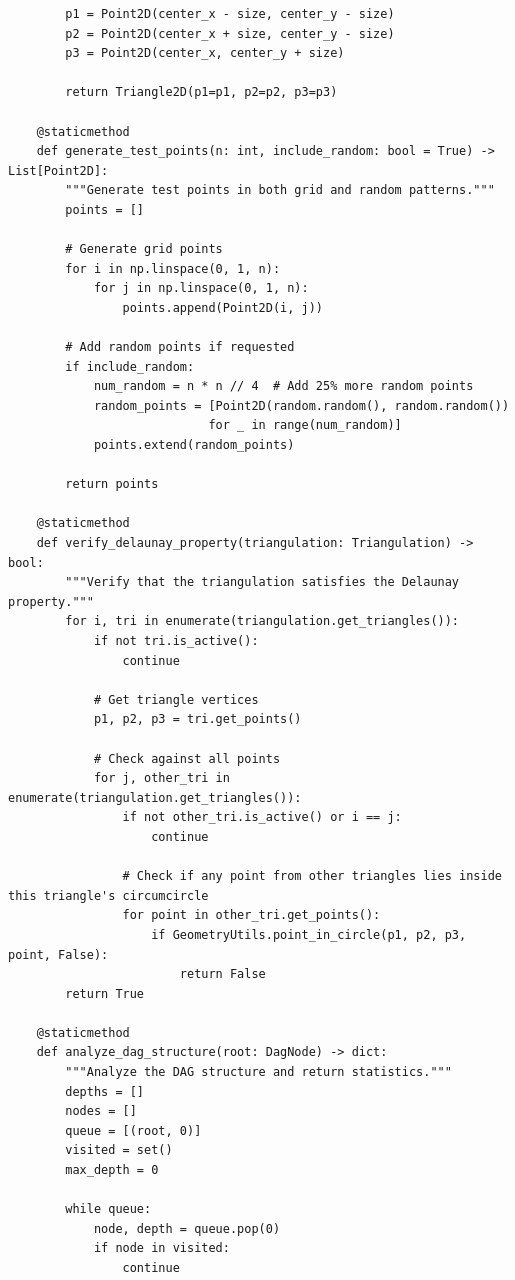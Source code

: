 \documentclass{article}
\begin{document}
\begin{lstlisting}
        p1 = Point2D(center_x - size, center_y - size)
        p2 = Point2D(center_x + size, center_y - size)
        p3 = Point2D(center_x, center_y + size)
        
        return Triangle2D(p1=p1, p2=p2, p3=p3)

    @staticmethod
    def generate_test_points(n: int, include_random: bool = True) -> List[Point2D]:
        """Generate test points in both grid and random patterns."""
        points = []
        
        # Generate grid points
        for i in np.linspace(0, 1, n):
            for j in np.linspace(0, 1, n):
                points.append(Point2D(i, j))
        
        # Add random points if requested
        if include_random:
            num_random = n * n // 4  # Add 25% more random points
            random_points = [Point2D(random.random(), random.random()) 
                            for _ in range(num_random)]
            points.extend(random_points)
        
        return points

    @staticmethod
    def verify_delaunay_property(triangulation: Triangulation) -> bool:
        """Verify that the triangulation satisfies the Delaunay property."""
        for i, tri in enumerate(triangulation.get_triangles()):
            if not tri.is_active():
                continue
                
            # Get triangle vertices
            p1, p2, p3 = tri.get_points()
            
            # Check against all points
            for j, other_tri in enumerate(triangulation.get_triangles()):
                if not other_tri.is_active() or i == j:
                    continue
                    
                # Check if any point from other triangles lies inside this triangle's circumcircle
                for point in other_tri.get_points():
                    if GeometryUtils.point_in_circle(p1, p2, p3, point, False):
                        return False
        return True

    @staticmethod
    def analyze_dag_structure(root: DagNode) -> dict:
        """Analyze the DAG structure and return statistics."""
        depths = []
        nodes = []
        queue = [(root, 0)]
        visited = set()
        max_depth = 0
        
        while queue:
            node, depth = queue.pop(0)
            if node in visited:
                continue
            

\end{lstlisting}
\end{document}
